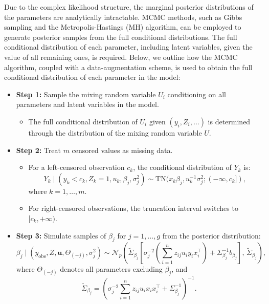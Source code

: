 \documentclass[10.5pt]{article} %
\begin{document}
Due to the complex likelihood structure, the marginal posterior distributions of the parameters are analytically intractable. MCMC methods, such as Gibbs sampling and the Metropolis-Hastings (MH) algorithm, can be employed to generate posterior samples from the full conditional distributions. The full conditional distribution of each parameter, including latent variables, given the value of all remaining ones, is required. Below, we outline how the MCMC algorithm, coupled with a data-augmentation scheme, is used to obtain the full conditional distribution of each parameter in the model:

\begin{itemize}
    \item \textbf{Step 1:} Sample the mixing random variable $U_i$ conditioning on all parameters and latent variables in the model.
    \begin{itemize}
        \item The full conditional distribution of $U_i$ given $(y_i, Z_i, \dots)$ is determined through the distribution of the mixing random variable $U$.
    \end{itemize}
    
    \item \textbf{Step 2:} Treat $m$ censored values as missing data.
    \begin{itemize}
        \item For a left-censored observation $c_k$, the conditional distribution of $Y_k$ is:
        \[
        Y_k \mid (y_k < c_k, Z_k = 1, u_k, \beta_j, \sigma_j^2) \sim \text{TN}(x_k \beta_j, u_k^{-1} \sigma_j^2; (-\infty, c_k]),
        \]
        where $k = 1, \dots, m$.
        \item For right-censored observations, the truncation interval switches to $[c_k, +\infty)$.
    \end{itemize}
    
    \item \textbf{Step 3:} Simulate samples of $\beta_j$ for $j = 1, \dots, g$ from the posterior distribution:
\[
\beta_j \mid (y_{\text{obs}}, Z, \mathbf{u}, \Theta_{(-j)}, \sigma_j^2) \sim \mathcal{N}_p \left( \tilde{\Sigma}_{\beta_j} \left[ \sigma_j^{-2} \left( \sum_{i=1}^n z_{ij} u_i y_i x_i^\top \right) + \Sigma_{\beta_j}^{-1} b_{\beta_j} \right], \, \tilde{\Sigma}_{\beta_j} \right),
\]
where $\Theta_{(-j)}$ denotes all parameters excluding $\beta_j$, and
\[
\tilde{\Sigma}_{\beta_j} = \left( \sigma_j^{-2} \sum_{i=1}^n z_{ij} u_i x_i x_i^\top + \Sigma_{\beta_j}^{-1} \right)^{-1}.
\]


\end{itemize}
\end{document}
